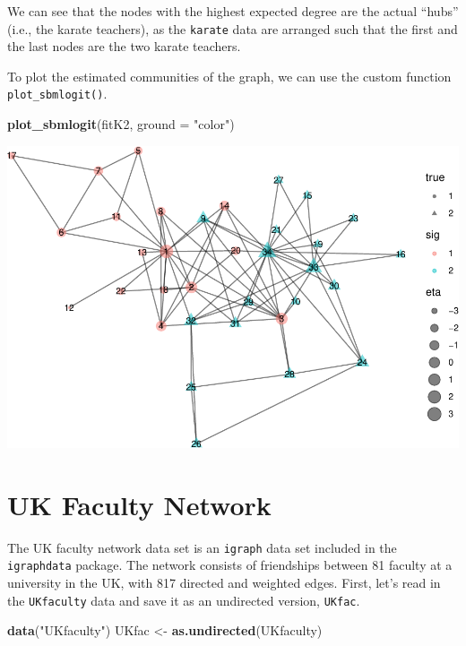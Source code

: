\documentclass[]{article}
\newenvironment{Shaded}{\begin{snugshade}}{\end{snugshade}}
\newcommand{\DataTypeTok}[1]{\textcolor[rgb]{0.13,0.29,0.53}{#1}}
\newcommand{\KeywordTok}[1]{\textcolor[rgb]{0.13,0.29,0.53}{\textbf{#1}}}
\newcommand{\NormalTok}[1]{#1}
\newcommand{\StringTok}[1]{\textcolor[rgb]{0.31,0.60,0.02}{#1}}
\begin{document}
We can see that the nodes with the highest expected degree are the
actual ``hubs'' (i.e., the karate teachers), as the \texttt{karate} data
are arranged such that the first and the last nodes are the two karate
teachers.

To plot the estimated communities of the graph, we can use the custom
function \texttt{plot\_sbmlogit()}.

\begin{Shaded}
\begin{Highlighting}[]
\KeywordTok{plot_sbmlogit}\NormalTok{(fitK2, }\DataTypeTok{ground =} \StringTok{"color"}\NormalTok{)}
\end{Highlighting}
\end{Shaded}

\includegraphics{karate_test_files/figure-latex/unnamed-chunk-13-1.pdf}

\hypertarget{uk-faculty-network}{%
\section{UK Faculty Network}\label{uk-faculty-network}}

The UK faculty network data set is an \texttt{igraph} data set included
in the \texttt{igraphdata} package. The network consists of friendships
between 81 faculty at a university in the UK, with 817 directed and
weighted edges. First, let's read in the \texttt{UKfaculty} data and
save it as an undirected version, \texttt{UKfac}.

\begin{Shaded}
\begin{Highlighting}[]
\KeywordTok{data}\NormalTok{(}\StringTok{"UKfaculty"}\NormalTok{)}
\NormalTok{UKfac <-}\StringTok{ }\KeywordTok{as.undirected}\NormalTok{(UKfaculty)}
\end{Highlighting}
\end{Shaded}
\end{document}
